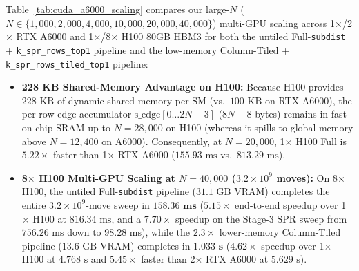 \documentclass[11pt,a4paper]{article}
\theoremstyle{definition}
\begin{document}
Table~\ref{tab:cuda_a6000_scaling} compares our large-$N$ ($N \in \{1{,}000, 2{,}000, 4{,}000, 10{,}000, 20{,}000, 40{,}000\}$) multi-GPU scaling across 1$\times$/2$\times$ RTX A6000 and 1$\times$/8$\times$ H100 80GB HBM3 for both the untiled Full-\texttt{subdist} + \texttt{k\_spr\_rows\_top1} pipeline and the low-memory Column-Tiled + \texttt{k\_spr\_rows\_tiled\_top1} pipeline:
\begin{itemize}
    \item \textbf{228 KB Shared-Memory Advantage on H100:} Because H100 provides $228\text{ KB}$ of dynamic shared memory per SM (vs.\ $100\text{ KB}$ on RTX A6000), the per-row edge accumulator $\text{s\_edge}[0 \dots 2N-3]$ ($8N-8$ bytes) remains in fast on-chip SRAM up to $N = 28{,}000$ on H100 (whereas it spills to global memory above $N = 12{,}400$ on A6000). Consequently, at $N = 20{,}000$, 1$\times$ H100 Full is $\mathbf{5.22\times}$ faster than 1$\times$ RTX A6000 ($155.93\text{ ms}$ vs.\ $813.29\text{ ms}$).
    \item \textbf{8$\times$ H100 Multi-GPU Scaling at $N = 40{,}000$ ($3.2 \times 10^9$ moves):} On 8$\times$ H100, the untiled Full-\texttt{subdist} pipeline ($31.1\text{ GB}$ VRAM) completes the entire $3.2 \times 10^9$-move sweep in $\mathbf{158.36\text{ ms}}$ ($\mathbf{5.15\times}$ end-to-end speedup over 1$\times$ H100 at $816.34\text{ ms}$, and a $\mathbf{7.70\times}$ speedup on the Stage-3 SPR sweep from $756.26\text{ ms}$ down to $98.28\text{ ms}$), while the $2.3\times$ lower-memory Column-Tiled pipeline ($13.6\text{ GB}$ VRAM) completes in $\mathbf{1.033\text{ s}}$ ($\mathbf{4.62\times}$ speedup over 1$\times$ H100 at $4.768\text{ s}$ and $\mathbf{5.45\times}$ faster than 2$\times$ RTX A6000 at $5.629\text{ s}$).
\end{itemize}
\end{document}
